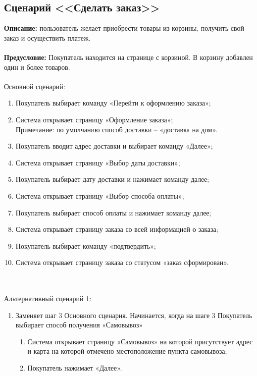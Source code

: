 \documentclass[a4paper]{report}
\begin{document}
\subsection*{Сценарий <<Сделать заказ>>}    
\textbf{Описание:} пользователь желает приобрести товары из корзины, получить свой заказ и осуществить платеж.\\\\
\textbf{Предусловие:} Покупатель находится на странице с корзиной. В корзину добавлен один и более товаров.\\\\
Основной сценарий:
\begin{enumerate}
    \item Покупатель выбирает команду «Перейти к оформлению заказа»;
    \item Система открывает страницу «Оформление заказа»;\\Примечание: по умолчанию способ доставки – «доставка на дом».
    \item Покупатель вводит адрес доставки и выбирает команду «Далее»;
    \item Система открывает страницу «Выбор даты доставки»;
    \item Покупатель выбирает дату доставки и нажимает команду далее;
    \item Система открывает страницу «Выбор способа оплаты»;
    \item Покупатель выбирает способ оплаты и нажимает команду далее;
    \item Система открывает страницу заказа со всей информацией о заказа;
    \item Покупатель выбирает команду «подтвердить»;
    \item Система открывает страницу заказа со статусом «заказ сформирован».
\end{enumerate}
$$$$\\\\
Альтернативный сценарий 1:
\begin{enumerate}
    \item Заменяет шаг 3 Основного сценария. Начинается, когда на шаге 3 Покупатель выбирает способ получения «Самовывоз»
    \begin{enumerate}
        \item Система открывает страницу «Самовывоз» на которой присутствует адрес и карта на которой отмечено местоположение пункта самовывоза;
        \item Покупатель нажимает «Далее».
    \end{enumerate}
\end{enumerate}
\end{document}
